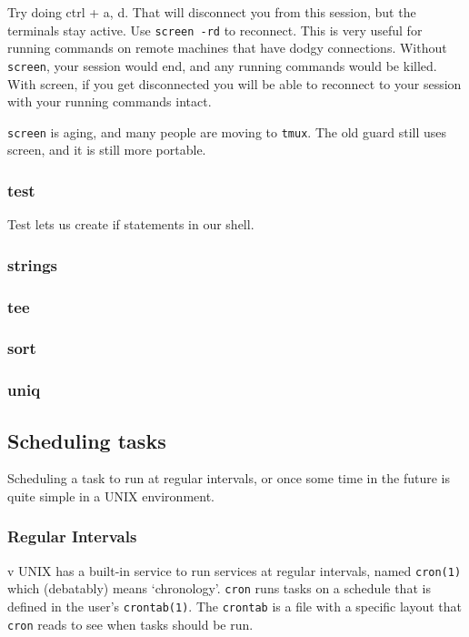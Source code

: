 Try doing ctrl + a, d. That will disconnect you from this session, but the terminals stay
active. Use {\tt screen -rd} to reconnect. This is very useful for running commands
on remote machines that have dodgy connections. Without {\tt screen}, your session would
end, and any running commands would be killed. With screen, if you get disconnected
you will be able to reconnect to your session with your running commands intact.

{\tt screen} is aging, and many people are moving to {\tt tmux}.  The old guard still
uses screen, and it is still more portable.

\subsubsection{test}
Test lets us create if statements in our shell.


\subsubsection{strings}
\subsubsection{tee}
\subsubsection{sort}
\subsubsection{uniq}


\subsection	{Scheduling tasks  }
\label{subsection:cron}

Scheduling a task to run at regular intervals, or once some time in the future 
is quite simple in a UNIX environment.

\subsubsection{Regular Intervals}v
UNIX has a built-in service to run services at regular intervals, named {\tt cron(1)}
which (debatably) means `chronology'. {\tt cron} runs tasks on a schedule that is
defined in the user's {\tt crontab(1)}. The {\tt crontab} is a file with 
a specific layout that {\tt cron} reads to see when tasks should be run.

